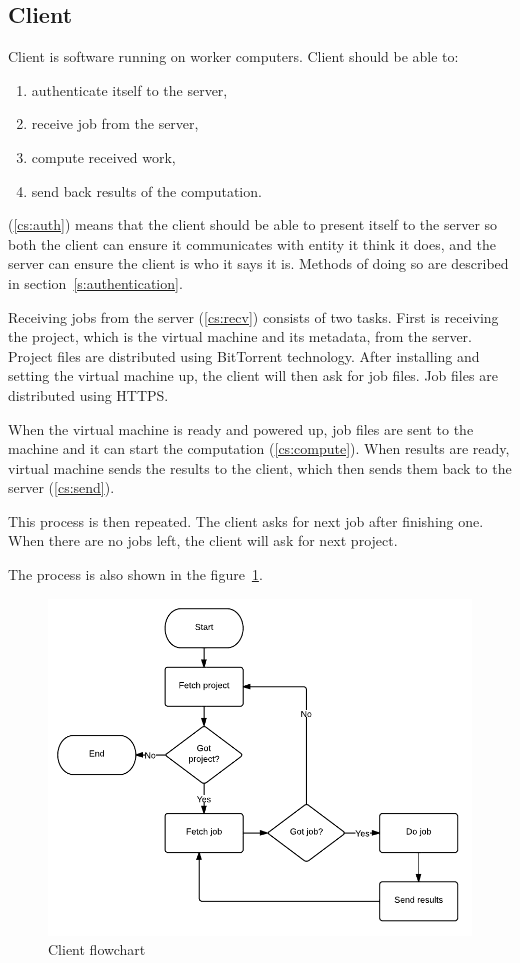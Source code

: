 \subsection{Client}

Client is software running on worker computers. Client should be able to:
\begin{enumerate}
	\item \label{cs:auth} authenticate itself to the server,
	\item \label{cs:recv} receive job from the server,
	\item \label{cs:compute} compute received work,
	\item \label{cs:send} send back results of the computation.
\end{enumerate}

(\ref{cs:auth}) means that the client should be able to present itself to the server so both the client can ensure it communicates with entity it think it does, and the server can ensure the client is who it says it is. Methods of doing so are described in section~\ref{s:authentication}.

Receiving jobs from the server (\ref{cs:recv}) consists of two tasks. First is receiving the project, which is the virtual machine and its metadata, from the server. Project files are distributed using BitTorrent technology. After installing and setting the virtual machine up, the client will then ask for job files. Job files are distributed using HTTPS.

When the virtual machine is ready and powered up, job files are sent to the machine and it can start the computation (\ref{cs:compute}). When results are ready, virtual machine sends the results to the client, which then sends them back to the server (\ref{cs:send}).

This process is then repeated. The client asks for next job after finishing one. When there are no jobs left, the client will ask for next project.

The process is also shown in the figure~\ref{f:clientflow}.

\begin{figure}
\centering
\includegraphics{diagrams/ClientFlowchart.pdf}
\caption{Client flowchart}
\label{f:clientflow}
\end{figure}

